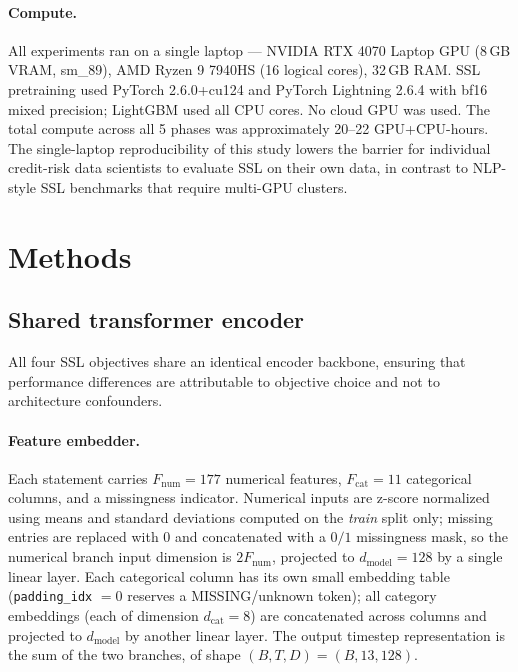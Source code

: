 \documentclass[sigconf, anonymous, review]{acmart}
\begin{document}
\paragraph{Compute.}
All experiments ran on a single laptop --- NVIDIA RTX 4070 Laptop GPU
(8\,GB VRAM, sm\_89), AMD Ryzen 9 7940HS (16 logical cores), 32\,GB
RAM. SSL pretraining used PyTorch 2.6.0+cu124 and PyTorch Lightning
2.6.4 with bf16 mixed precision; LightGBM used all CPU cores. No
cloud GPU was used. The total compute across all 5 phases was
approximately 20--22 GPU+CPU-hours. The single-laptop reproducibility
of this study lowers the barrier for individual credit-risk data
scientists to evaluate SSL on their own data, in contrast to
NLP-style SSL benchmarks that require multi-GPU clusters.

\section{Methods}
\label{sec:methods}

\subsection{Shared transformer encoder}
\label{sec:enc}

All four SSL objectives share an identical encoder backbone, ensuring
that performance differences are attributable to objective choice
and not to architecture confounders.

\paragraph{Feature embedder.}
Each statement carries $F_{\text{num}} = 177$ numerical features,
$F_{\text{cat}} = 11$ categorical columns, and a missingness
indicator. Numerical inputs are z-score normalized using means and
standard deviations computed on the \emph{train} split only;
missing entries are replaced with $0$ and concatenated with a $0/1$
missingness mask, so the numerical branch input dimension is
$2F_{\text{num}}$, projected to $d_{\text{model}} = 128$ by a single
linear layer. Each categorical column has its own small embedding
table (\texttt{padding\_idx} $= 0$ reserves a MISSING/unknown token);
all category embeddings (each of dimension $d_{\text{cat}} = 8$) are
concatenated across columns and projected to $d_{\text{model}}$ by
another linear layer. The output timestep representation is the sum
of the two branches, of shape $(B, T, D) = (B, 13, 128)$.
\end{document}
